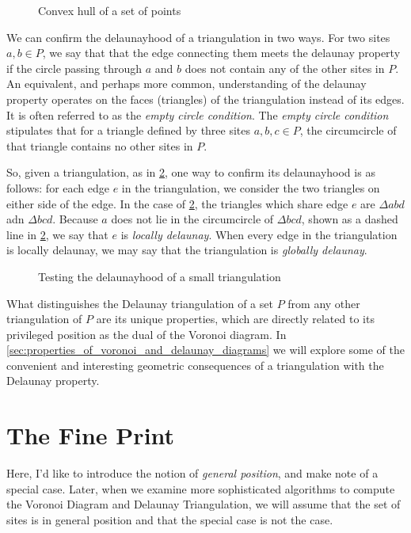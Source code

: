 \documentclass[12pt,twoside]{reedthesis}
\begin{document}
    \begin{figure}[!htb]
      \centering
      
      \caption{Convex hull of a set of points}
      \label{fig:convex_hull}
    \end{figure}

    We can confirm the delaunayhood of a triangulation in two ways. For two sites $a, b \in P$, we say that that the edge connecting them meets the delaunay property if the circle passing through $a$ and $b$ does not contain any of the other sites in $P$. An equivalent, and perhaps more common, understanding of the delaunay property operates on the faces (triangles) of the triangulation instead of its edges. It is often referred to as the \emph{empty circle condition}. The \emph{empty circle condition} stipulates that for a triangle defined by three sites $a, b, c \in P$, the circumcircle of that triangle contains no other sites in $P$.\par

    So, given a triangulation, as in \cref{fig:delaunayhood_small}, one way to confirm its delaunayhood is as follows: for each edge $e$ in the triangulation, we consider the two triangles on either side of the edge.  In the case of \cref{fig:delaunayhood_small}, the triangles which share edge $e$ are $\Delta abd$ adn $\Delta bcd$. Because $a$ does not lie in the circumcircle of $\Delta bcd$, shown as a dashed line in \cref{fig:delaunayhood_small}, we say that $e$ is \emph{locally delaunay}. When every edge in the triangulation is locally delaunay, we may say that the triangulation is \emph{globally delaunay}.

    \begin{figure}[!htb]
      \centering
      
      \caption{Testing the delaunayhood of a small triangulation}
      \label{fig:delaunayhood_small}
    \end{figure}

    What distinguishes the Delaunay triangulation of a set $P$ from any other triangulation of $P$ are its unique properties, which are directly related to its privileged position as the dual of the Voronoi diagram. In \cref{sec:properties_of_voronoi_and_delaunay_diagrams} we will explore some of the convenient and interesting geometric consequences of a triangulation with the Delaunay property.\par

  \section{The Fine Print}
  \label{sec:the_fine_print}
    Here, I'd like to introduce the notion of \emph{general position}, and make note of a special case. Later, when we examine more sophisticated algorithms to compute the Voronoi Diagram and Delaunay Triangulation, we will assume that the set of sites is in general position and that the special case is not the case.
\end{document}

